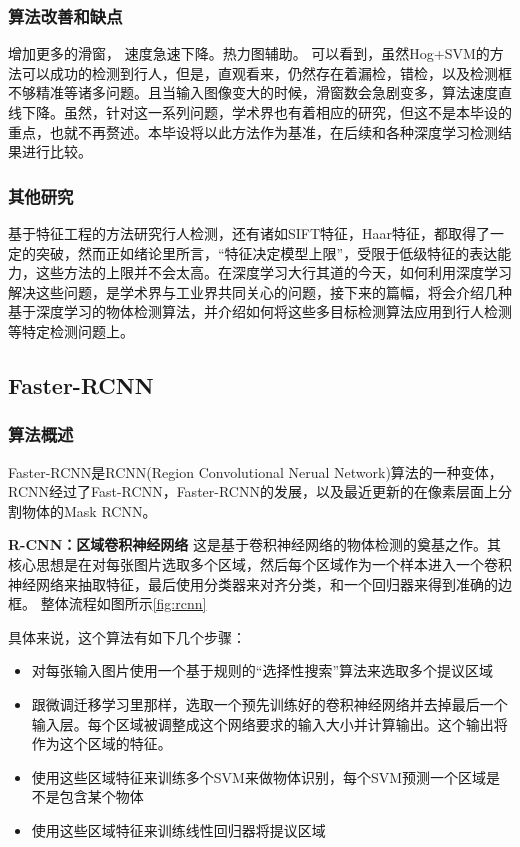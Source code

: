 \documentclass[12pt,a4paper,titlepage]{article}
\begin{document}
\subsubsection{算法改善和缺点}
增加更多的滑窗， 速度急速下降。热力图辅助。
可以看到，虽然Hog+SVM的方法可以成功的检测到行人，但是，直观看来，仍然存在着漏检，错检，以及检测框不够精准等诸多问题。且当输入图像变大的时候，滑窗数会急剧变多，算法速度直线下降。虽然，针对这一系列问题，学术界也有着相应的研究，但这不是本毕设的重点，也就不再赘述。本毕设将以此方法作为基准，在后续和各种深度学习检测结果进行比较。


\subsubsection{其他研究}
基于特征工程的方法研究行人检测，还有诸如SIFT特征，Haar特征，都取得了一定的突破，然而正如绪论里所言，“特征决定模型上限”，受限于低级特征的表达能力，这些方法的上限并不会太高。在深度学习大行其道的今天，如何利用深度学习解决这些问题，是学术界与工业界共同关心的问题，接下来的篇幅，将会介绍几种基于深度学习的物体检测算法，并介绍如何将这些多目标检测算法应用到行人检测等特定检测问题上。

\subsection{Faster-RCNN}
\subsubsection{算法概述}
Faster-RCNN是RCNN(Region Convolutional Nerual Network)算法的一种变体，RCNN经过了Fast-RCNN，Faster-RCNN的发展，以及最近更新的在像素层面上分割物体的Mask RCNN。
\par
\textbf{R-CNN：区域卷积神经网络}
这是基于卷积神经网络的物体检测的奠基之作。其核心思想是在对每张图片选取多个区域，然后每个区域作为一个样本进入一个卷积神经网络来抽取特征，最后使用分类器来对齐分类，和一个回归器来得到准确的边框。
整体流程如图所示\ref{fig:rcnn}

具体来说，这个算法有如下几个步骤：

\begin{itemize}
\item 对每张输入图片使用一个基于规则的“选择性搜索”算法来选取多个提议区域
\item 跟微调迁移学习里那样，选取一个预先训练好的卷积神经网络并去掉最后一个输入层。每个区域被调整成这个网络要求的输入大小并计算输出。这个输出将作为这个区域的特征。
\item 使用这些区域特征来训练多个SVM来做物体识别，每个SVM预测一个区域是不是包含某个物体
\item 使用这些区域特征来训练线性回归器将提议区域
\end{itemize}
\end{document}
